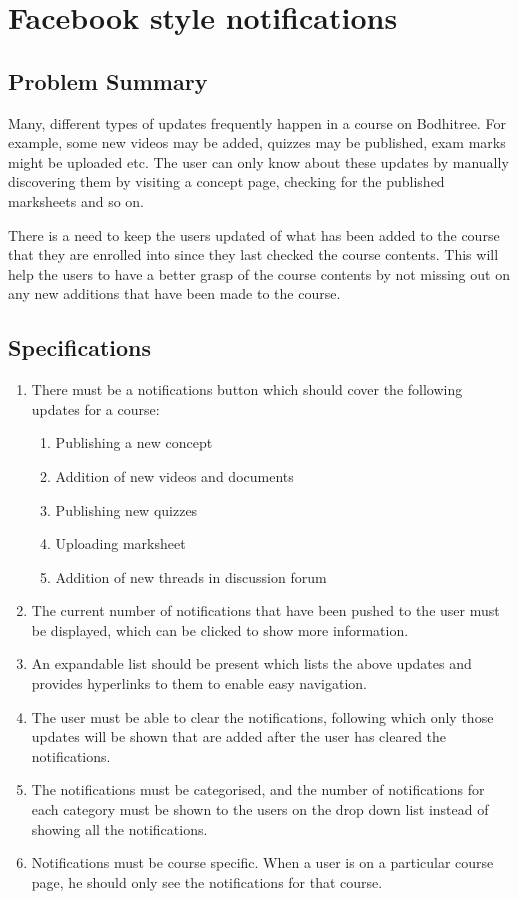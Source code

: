 \section{Facebook style notifications}

\subsection{Problem Summary}

\hspace{0.35cm} Many, different types of updates frequently happen in a course on Bodhitree. For example, some new videos may be added, quizzes may be published, exam marks might be uploaded etc. The user can only know about these updates by manually discovering them by visiting a concept page, checking for the published marksheets and so on.
\par There is a need to keep the users updated of what has been added to the course that they are enrolled into since they last checked the course contents. This will help the users to have a better grasp of the course contents by not missing out on any new additions that have been made to the course.

\subsection{Specifications}

\begin{enumerate}
	\item There must be a notifications button which should cover the following updates for a course:
	\begin{enumerate}
		\item Publishing a new concept
		\item Addition of new videos and documents
		\item Publishing new quizzes
		\item Uploading marksheet
		\item Addition of new threads in discussion forum
	\end{enumerate}
	\item The current number of notifications that have been pushed to the user must be displayed, which can be clicked to show more information.
	\item An expandable list should be present which lists the above updates and provides hyperlinks to them to enable easy navigation.
	\item The user must be able to clear the notifications, following which only those updates will be shown that are added after the user has cleared the notifications.
	\item The notifications must be categorised, and the number of notifications for each category must be shown to the users on the drop down list instead of showing all the notifications.
	\item Notifications must be course specific. When a user is on a particular course page, he should only see the notifications for that course.
\end{enumerate}

